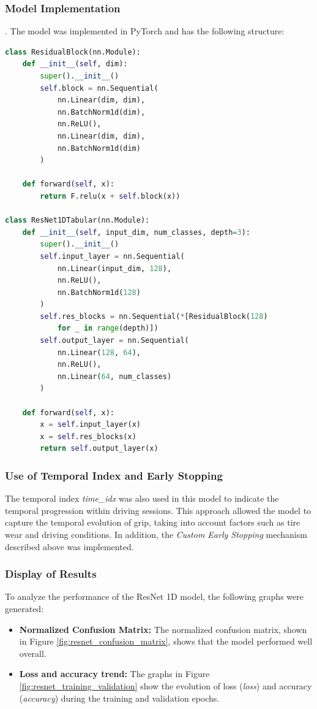 \documentclass[a4paper,final,12pt]{report}
\begin{document}
\subsubsection{Model Implementation}.
The model was implemented in PyTorch and has the following structure:
\begin{lstlisting}[language=Python, caption=Architecture of the ResNet 1D model]
class ResidualBlock(nn.Module):
    def __init__(self, dim):
        super().__init__()
        self.block = nn.Sequential(
            nn.Linear(dim, dim),
            nn.BatchNorm1d(dim),
            nn.ReLU(),
            nn.Linear(dim, dim),
            nn.BatchNorm1d(dim)
        )

    def forward(self, x):
        return F.relu(x + self.block(x))

class ResNet1DTabular(nn.Module):
    def __init__(self, input_dim, num_classes, depth=3):
        super().__init__()
        self.input_layer = nn.Sequential(
            nn.Linear(input_dim, 128),
            nn.ReLU(),
            nn.BatchNorm1d(128)
        )
        self.res_blocks = nn.Sequential(*[ResidualBlock(128) 
            for _ in range(depth)])
        self.output_layer = nn.Sequential(
            nn.Linear(128, 64),
            nn.ReLU(),
            nn.Linear(64, num_classes)
        )

    def forward(self, x):
        x = self.input_layer(x)
        x = self.res_blocks(x)
        return self.output_layer(x)
\end{lstlisting}

\subsubsection{Use of Temporal Index and Early Stopping}
The temporal index \textit{time\_idx} was also used in this model to indicate the temporal progression within driving sessions. This approach allowed the model to capture the temporal evolution of grip, taking into account factors such as tire wear and driving conditions.
In addition, the \textit{Custom Early Stopping} mechanism described above was implemented.

\subsubsection{Display of Results}
To analyze the performance of the ResNet 1D model, the following graphs were generated:

\begin{itemize}
    \item \textbf{Normalized Confusion Matrix:}  
    The normalized confusion matrix, shown in Figure \ref{fig:resnet_confusion_matrix}, shows that the model performed well overall.

    \item \textbf{Loss and accuracy trend:}  
    The graphs in Figure \ref{fig:resnet_training_validation} show the evolution of loss (\textit{loss}) and accuracy (\textit{accuracy}) during the training and validation epochs.
\end{itemize}
\end{document}
